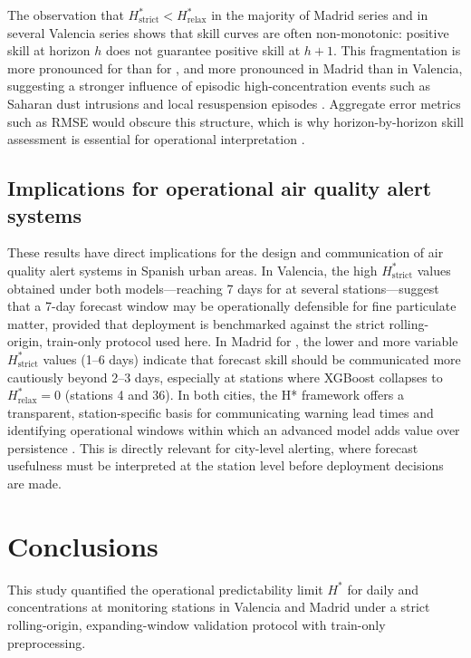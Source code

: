 \documentclass[12pt, a4paper]{article}
\newcommand{\Hstar}{H^{*}}
\newcommand{\Hrelax}{H^{*}_{\mathrm{relax}}}
\newcommand{\Hstrict}{H^{*}_{\mathrm{strict}}}
\begin{document}
The observation that $\Hstrict < \Hrelax$ in the majority of Madrid
series and in several Valencia series shows that skill curves are
often non-monotonic: positive skill at horizon $h$ does not guarantee
positive skill at $h+1$. This fragmentation is more pronounced for
 than for , and more pronounced in Madrid than
in Valencia, suggesting a stronger influence of episodic
high-concentration events such as Saharan dust intrusions and local
resuspension episodes \citep{Pey2013, Querol2024}. Aggregate error
metrics such as RMSE would obscure this structure, which is why
horizon-by-horizon skill assessment is essential for operational
interpretation \citep{Cerqueira2020}.

\subsection{Implications for operational air quality alert systems}
\label{sec:disc_operational}

These results have direct implications for the design and
communication of air quality alert systems in Spanish urban areas.
In Valencia, the high $\Hstrict$ values obtained under both
models—reaching 7 days for  at several stations—suggest
that a 7-day forecast window may be operationally defensible for fine
particulate matter, provided that deployment is benchmarked against
the strict rolling-origin, train-only protocol used here. In Madrid
for , the lower and more variable $\Hstrict$ values (1--6
days) indicate that forecast skill should be communicated more
cautiously beyond 2--3 days, especially at stations where XGBoost
collapses to $\Hrelax = 0$ (stations 4 and 36). In both cities, the
H* framework offers a transparent, station-specific basis for
communicating warning lead times and identifying operational windows
within which an advanced model adds value over persistence
\citep{GarciaCrespi2026}. This is directly relevant for city-level
alerting, where forecast usefulness must be interpreted at the
station level before deployment decisions are made.

\section{Conclusions}
\label{sec:conclusions}
This study quantified the operational predictability limit $\Hstar$
for daily  and  concentrations at monitoring
stations in Valencia and Madrid under a strict rolling-origin,
expanding-window validation protocol with train-only preprocessing.
\end{document}
